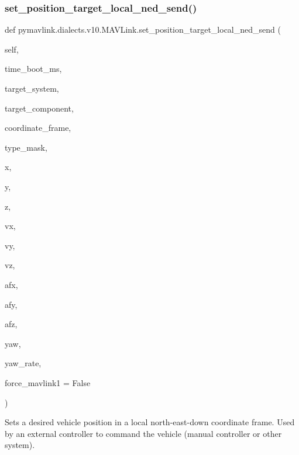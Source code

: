\begin{DoxyVerb}
\begin{DoxyVerb}
\begin{DoxyVerb}
\begin{DoxyVerb}
\begin{DoxyVerb}
\begin{DoxyVerb}
\begin{DoxyVerb}
\begin{DoxyVerb}
\begin{DoxyVerb}
\begin{DoxyVerb}
\subsubsection{\texorpdfstring{set\+\_\+position\+\_\+target\+\_\+local\+\_\+ned\+\_\+send()}{set\_position\_target\_local\_ned\_send()}}
{\footnotesize\ttfamily def pymavlink.\+dialects.\+v10.\+M\+A\+V\+Link.\+set\+\_\+position\+\_\+target\+\_\+local\+\_\+ned\+\_\+send (\begin{DoxyParamCaption}\item[{}]{self,  }\item[{}]{time\+\_\+boot\+\_\+ms,  }\item[{}]{target\+\_\+system,  }\item[{}]{target\+\_\+component,  }\item[{}]{coordinate\+\_\+frame,  }\item[{}]{type\+\_\+mask,  }\item[{}]{x,  }\item[{}]{y,  }\item[{}]{z,  }\item[{}]{vx,  }\item[{}]{vy,  }\item[{}]{vz,  }\item[{}]{afx,  }\item[{}]{afy,  }\item[{}]{afz,  }\item[{}]{yaw,  }\item[{}]{yaw\+\_\+rate,  }\item[{}]{force\+\_\+mavlink1 = {\ttfamily False} }\end{DoxyParamCaption})}

\begin{DoxyVerb}Sets a desired vehicle position in a local north-east-down coordinate
frame. Used by an external controller to command the
vehicle (manual controller or other system).


\end{DoxyVerb}
\end{DoxyVerb}
\end{DoxyVerb}
\end{DoxyVerb}
\end{DoxyVerb}
\end{DoxyVerb}
\end{DoxyVerb}
\end{DoxyVerb}
\end{DoxyVerb}
\end{DoxyVerb}
\end{DoxyVerb}
